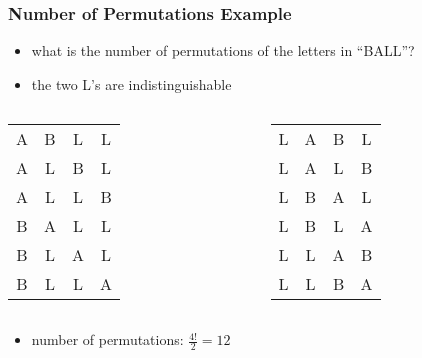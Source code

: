 \documentclass[dvipsnames]{beamer}
\begin{document}
\begin{frame}
  \frametitle{Number of Permutations Example}

  \begin{example}
    \begin{itemize}
      \item what is the number of permutations of the letters in ``BALL''?
      \item the two L's are indistinguishable
    \end{itemize}

    \pause
    \begin{columns}[t]
      \begin{tabular}{c c c c}
 A & B & L & L\\
 A & L & B & L\\
 A & L & L & B\\
 B & A & L & L\\
 B & L & A & L\\
 B & L & L & A
      \end{tabular}

      \begin{tabular}{c c c c}
 L & A & B & L\\
 L & A & L & B\\
 L & B & A & L\\
 L & B & L & A\\
 L & L & A & B\\
 L & L & B & A
      \end{tabular}
    \end{columns}

    \pause
    \begin{itemize}
      \item number of permutations: $\frac{4!}{2} = 12$
    \end{itemize}
  \end{example}
\end{frame}
\end{document}
